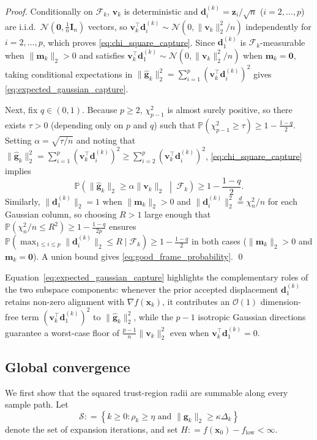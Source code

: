 \documentclass[smallextended]{svjour3}
\newcommand{\bx}{\bm{x}}
\newcommand{\bd}{\bm{d}}
\newcommand{\bg}{\bm{g}}
\newcommand{\bz}{\bm{z}}
\providecommand{\coloneqq}{\mathrel{\mathop:}=}
\begin{document}
\begin{proof}
Conditionally on $\mathcal F_k$, $\bm v_k$ is deterministic and $\bd_i^{(k)} = \bz_i/\sqrt{n}$ ($i=2,\ldots,p$) are i.i.d.\ $\mathcal N(\bm 0, \frac{1}{n}\bm I_n)$ vectors, so $\bm v_k^\top\bd_i^{(k)} \sim \mathcal N(0, \|\bm v_k\|_2^2/n)$ independently for $i=2,\ldots,p$, which proves \eqref{eq:chi_square_capture}. Since $\bd_1^{(k)}$ is $\mathcal F_k$-measurable when $\|\bm m_k\|_2 > 0$ and satisfies $\bm v_k^\top\bd_1^{(k)} \sim \mathcal N(0, \|\bm v_k\|_2^2/n)$ when $\bm m_k = \bm 0$, taking conditional expectations in $\|\hat{\bg}_k\|_2^2 = \sum_{i=1}^p (\bm v_k^\top\bd_i^{(k)})^2$ gives \eqref{eq:expected_gaussian_capture}.

Next, fix $q\in(0,1)$. Because $p\ge 2$, $\chi^2_{p-1}$ is almost surely positive, so there exists $\tau>0$ (depending only on $p$ and $q$) such that $\mathbb P(\chi^2_{p-1}\ge\tau) \ge 1 - \frac{1-q}{2}$. Setting $\alpha=\sqrt{\tau/n}$ and noting that $\|\hat{\bg}_k\|_2^2 = \sum_{i=1}^p (\bm v_k^\top\bd_i^{(k)})^2 \ge \sum_{i=2}^p (\bm v_k^\top\bd_i^{(k)})^2$, \eqref{eq:chi_square_capture} implies
\[
\mathbb P\left( \|\hat{\bg}_k\|_2 \ge \alpha\|\bm v_k\|_2 \;\middle|\; \mathcal F_k \right) \ge 1 - \frac{1-q}{2}.
\]
Similarly, $\|\bd_1^{(k)}\|_2 = 1$ when $\|\bm m_k\|_2 > 0$ and $\|\bd_i^{(k)}\|_2^2 \overset{d}{=} \chi^2_n / n$ for each Gaussian column, so choosing $R > 1$ large enough that $\mathbb P(\chi^2_n / n \le R^2) \ge 1 - \frac{1-q}{2p}$ ensures $\mathbb P(\max_{1\le i\le p}\|\bd_i^{(k)}\|_2 \le R \mid \mathcal F_k) \ge 1 - \frac{1-q}{2}$ in both cases ($\|\bm m_k\|_2 > 0$ and $\bm m_k = \bm 0$). A union bound gives \eqref{eq:good_frame_probability}.
\qed
\end{proof}

Equation~\eqref{eq:expected_gaussian_capture} highlights the complementary roles of the two subspace components: whenever the prior accepted displacement $\bd_1^{(k)}$ retains non-zero alignment with $\nabla f(\bx_k)$, it contributes an $\mathcal{O}(1)$ dimension-free term $(\bm v_k^\top \bd_1^{(k)})^2$ to $\|\hat{\bg}_k\|_2^2$, while the $p-1$ isotropic Gaussian directions guarantee a worst-case floor of $\frac{p-1}{n}\|\bm v_k\|_2^2$ even when $\bm v_k^\top \bd_1^{(k)} = 0$.

\subsection{Global convergence}
\label{subsec:global_convergence}

We first show that the squared trust-region radii are summable along every sample path. Let
\begin{equation}
\label{eq:expansion_set}
\mathcal S \coloneqq \left\{ k \ge 0 : \rho_k\ge\eta \text{ and } \|\bg_k\|_2\ge\kappa\Delta_k \right\}
\end{equation}
denote the set of expansion iterations, and set $H \coloneqq f(\bx_0) - f_{\mathrm{low}} < \infty$.
\end{document}
